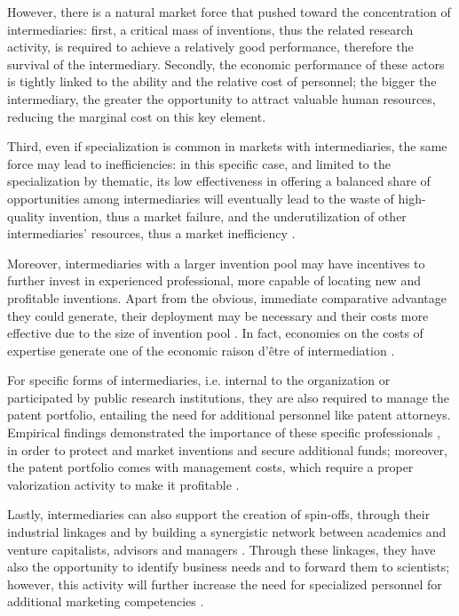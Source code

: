 However, there is a natural market force that pushed toward the concentration of intermediaries: first, a critical mass of inventions, thus the related research activity, is required to achieve a relatively good performance, therefore the survival of the intermediary. Secondly, the economic performance of these actors is tightly linked to the ability and the relative cost of personnel; the bigger the intermediary, the greater the opportunity to attract valuable human resources, reducing the marginal cost on this key element.

Third, even if specialization is common in markets with intermediaries, the same force may lead to inefficiencies: in this specific case, and limited to the specialization by thematic, its low effectiveness in offering a balanced share of opportunities among intermediaries will eventually lead to the waste of high-quality invention, thus a market failure, and the underutilization of other intermediaries' resources, thus a market inefficiency \citep{Hoppe2005}.

Moreover, intermediaries with a larger invention pool may have incentives to further invest in experienced professional, more capable of locating new and profitable inventions. Apart from the obvious, immediate comparative advantage they could generate, their deployment may be necessary and their costs more effective due to the size of invention pool \citep{Debackere2005}. In fact, economies on the costs of expertise generate one of the economic raison d'être of intermediation \citep{Hoppe2005}.

For specific forms of intermediaries, i.e. internal to the organization or participated by public research institutions, they are also required to manage the patent portfolio, entailing the need for additional personnel like patent attorneys. Empirical findings demonstrated the importance of these specific professionals \citep{Siegel2003a}, in order to protect and market inventions and secure additional funds; moreover, the patent portfolio comes with management costs, which require a proper valorization activity to make it profitable \citep{Balderi2010}.

Lastly, intermediaries can also support the creation of spin-offs, through their industrial linkages and by building a synergistic network between academics and venture capitalists, advisors and managers \citep{OShea2004}. Through these linkages, they have also the opportunity to identify business needs and to forward them to scientists; however, this activity will further increase the need for specialized personnel for additional marketing competencies \citep{Geuna2009,Muscio2008}. 

